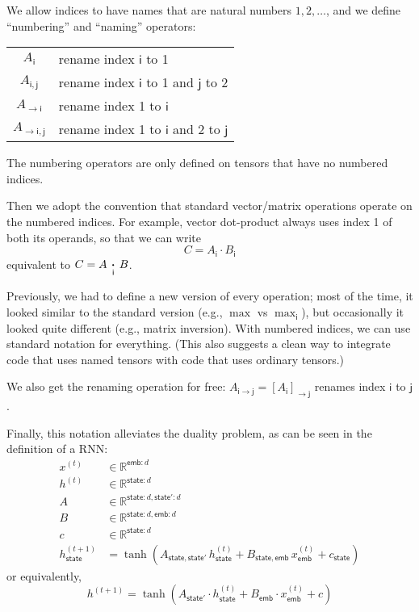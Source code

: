 \documentclass{article}
\newcommand{\name}[1]{\mathsf{#1}}
\newcommand{\nset}[2]{\name{#1}:#2}
\newcommand{\ndot}[1]{\mathbin{\mathop{\thinspace\boldsymbol\cdot\thinspace}\limits_{\name{#1}}}}
\begin{document}
We allow indices to have names that are natural numbers $1, 2, \ldots$, and we define ``numbering'' and ``naming'' operators:
\begin{center}
\begin{tabular}{cl}
$A_{\name{i}}$ & rename index $\name{i}$ to 1 \\
$A_{\name{i},\name{j}}$ & rename index $\name{i}$ to 1 and $\name{j}$ to 2 \\
$A_{\rightarrow\name{i}}$ & rename index 1 to $\name{i}$ \\
$A_{\rightarrow\name{i},\name{j}}$ & rename index 1 to $\name{i}$ and 2 to $\name{j}$
\end{tabular}
\end{center}
The numbering operators are only defined on tensors that have no numbered indices.

Then we adopt the convention that standard vector/matrix operations operate on the numbered indices. For example, vector dot-product always uses index 1 of both its operands, so that we can write
\begin{equation*}
C = A_{\name{i}} \cdot B_{\name{i}}
\end{equation*}
equivalent to $C = A \ndot{i} B$. 

Previously, we had to define a new version of every operation; most of the time, it looked similar to the standard version (e.g., $\max$ vs $\max_{\name{i}}$), but occasionally it looked quite different (e.g., matrix inversion). With numbered indices, we can use standard notation for everything.
(This also suggests a clean way to integrate code that uses named tensors with code that uses ordinary tensors.)

We also get the renaming operation for free: $A_{\name{i}\rightarrow\name{j}} = [A_{\name{i}}]_{\rightarrow\name{j}}$ renames index $\name{i}$ to $\name{j}$.

Finally, this notation alleviates the duality problem, as can be seen in the definition of a RNN:
\begin{align*}
x^{(t)} &\in \mathbb{R}^{\nset{emb}{d}} \\
h^{(t)} &\in \mathbb{R}^{\nset{state}{d}} \\
A &\in \mathbb{R}^{\nset{state}{d}, \nset{state'}{d}} \\
B &\in \mathbb{R}^{\nset{state}{d}, \nset{emb}{d}} \\
c &\in \mathbb{R}^{\nset{state}{d}} \\
h^{(t+1)}_{\name{state}} &= \tanh\left( A_{\name{state},\name{state'}} \, h^{(t)}_{\name{state}} + B_{\name{state},\name{emb}} \, x^{(t)}_{\name{emb}} + c_{\name{state}} \right)
\end{align*}
or equivalently,
\begin{equation*}
h^{(t+1)} = \tanh\left( A_{\name{state'}} \cdot h^{(t)}_{\name{state}} + B_{\name{emb}} \cdot x^{(t)}_{\name{emb}} + c \right)
\end{equation*}
\end{document}
